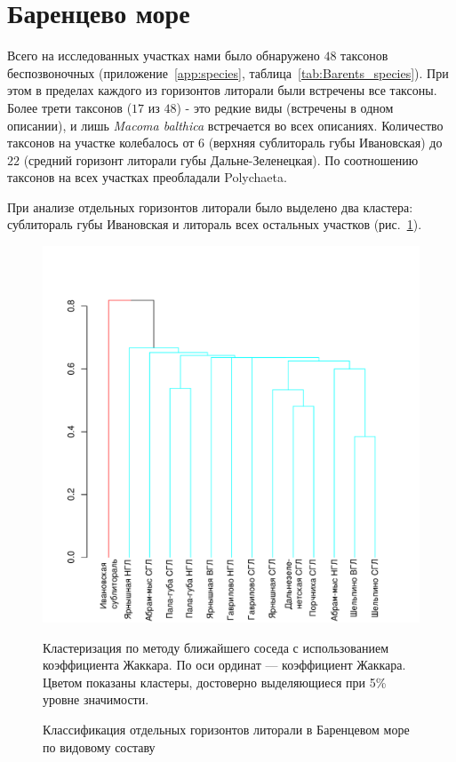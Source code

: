 \afterpage{\clearpage}

	\section{Баренцево море}

Всего на исследованных участках нами было обнаружено $48$ таксонов беспозвоночных (приложение~\ref{app:species}, таблица~\ref{tab:Barents_species}). 
При этом в пределах каждого из горизонтов литорали были встречены все таксоны. 
Более трети таксонов ($17$ из $48$) - это редкие виды (встречены в одном описании), и лишь {\it Macoma balthica} встречается во всех описаниях. 
Количество таксонов на участке колебалось от $6$ (верхняя сублитораль губы Ивановская) до $22$ (средний горизонт литорали губы Дальне-Зеленецкая). 
По соотношению таксонов на всех участках преобладали Polychaeta.
	

При анализе отдельных горизонтов литорали было выделено два кластера: сублитораль губы Ивановская и литораль всех остальных участков (рис.~\ref{ris:cluster_barents_species_tidal}). 
	\begin{figure}[p]
		\begin{center}
			\includegraphics{../Barenc_Sea/soobshestvo/Barents_fauna_tidal_jaccard_single_1.pdf}
		\end{center}
	\caption{Классификация отдельных горизонтов литорали в Баренцевом море по видовому составу}
	\label{ris:cluster_barents_species_tidal}

	\footnotesize{Кластеризация по методу ближайшего соседа с использованием коэффициента Жаккара. По оси ординат --- коэффициент Жаккара. Цветом показаны кластеры, достоверно выделяющиеся при 5\% уровне значимости.}
	\end{figure}

